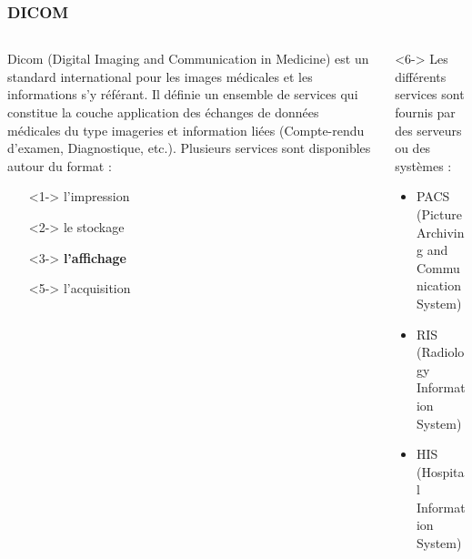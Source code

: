 
\begin{frame}%
\frametitle{DICOM} %
\begin{columns}[t]
  \begin{column}[t]{5cm}
    Dicom (Digital Imaging and Communication in Medicine) est un standard international pour les images médicales et les informations s'y référant. Il définie un ensemble de services qui constitue la couche application des échanges de données médicales du type imageries et information liées (Compte-rendu d'examen, Diagnostique, etc.)\cite{nema15:_dicom_ps3}. 
Plusieurs services sont disponibles autour du format :
\begin{itemize}
\item[\ding{213}]<1-> l'impression
\item[\ding{213}]<2-> le stockage
\item[\ding{213}]<3-> \textbf<4>{l'affichage}
\item[\ding{213}]<5-> l'acquisition
\end{itemize}
  \end{column}
  \begin{column}[t]{5cm}<6->
   Les différents services sont fournis par des serveurs ou des systèmes :
\begin{itemize}
\item PACS (Picture Archiving and Communication System)
\item  RIS (Radiology Information System)
\item  HIS (Hospital Information System)
\end{itemize}
  \end{column}
\end{columns}

\end{frame}